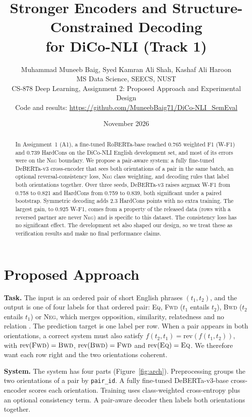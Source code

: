 \documentclass[10pt,a4paper,twocolumn]{article}
\title{Stronger Encoders and Structure-Constrained Decoding\\ for DiCo-NLI (Track 1)}
\author{Muhammad Muneeb Baig, Syed Kamran Ali Shah, Kashaf Ali Haroon\\ MS Data Science, SEECS, NUST\\ CS-878 Deep Learning, Assignment 2: Proposed Approach and Experimental Design\\ {\small Code and results: \url{https://github.com/MuneebBaig71/DiCo-NLI_SemEval}}}
\date{\vspace{-0.6em}November 2026\vspace{-1.4em}}
\newcommand{\Eq}{\textsc{Eq}}
\newcommand{\Fwd}{\textsc{Fwd}}
\newcommand{\Bwd}{\textsc{Bwd}}
\newcommand{\Neg}{\textsc{Neg}}
\begin{document}
\maketitle

\begin{abstract}
In Assignment~1 (A1), a fine-tuned RoBERTa-base reached 0.765 weighted F1 (W-F1) and 0.739 HardCons on the DiCo-NLI English development set, and most of its errors were on the \Neg{} boundary. We propose a pair-aware system: a fully fine-tuned DeBERTa-v3 cross-encoder that sees both orientations of a pair in the same batch, an optional reversal-consistency loss, \Neg{} class weighting, and decoding rules that label both orientations together. Over three seeds, DeBERTa-v3 raises argmax W-F1 from 0.758 to 0.821 and HardCons from 0.759 to 0.839, both significant under a paired bootstrap. Symmetric decoding adds 2.3 HardCons points with no extra training. The largest gain, to 0.925 W-F1, comes from a property of the released data (rows with a reversed partner are never \Neg) and is specific to this dataset. The consistency loss has no significant effect. The development set also shaped our design, so we treat these as verification results and make no final performance claims.
\end{abstract}

\section{Proposed Approach}
\label{sec:approach}

\textbf{Task.} The input is an ordered pair of short English phrases $(t_1,t_2)$, and the output is one of four labels for that ordered pair: \Eq, \Fwd{} ($t_1$ entails $t_2$), \Bwd{} ($t_2$ entails $t_1$) or \Neg, which merges opposition, similarity, relatedness and no relation \citep{diconli2026,maccartney2009natural}. The prediction target is one label per row. When a pair appears in both orientations, a correct system must also satisfy $f(t_2,t_1)=\mathrm{rev}(f(t_1,t_2))$, with $\mathrm{rev}(\Fwd)=\Bwd$, $\mathrm{rev}(\Bwd)=\Fwd$ and $\mathrm{rev}(\Eq)=\Eq$. We therefore want each row right and the two orientations coherent.

\textbf{System.} The system has four parts (Figure~\ref{fig:arch}). Preprocessing groups the two orientations of a pair by \texttt{pair\_id}. A fully fine-tuned DeBERTa-v3-base cross-encoder scores each orientation. Training uses class-weighted cross-entropy plus an optional consistency term. A pair-aware decoder then labels both orientations together.
\end{document}
